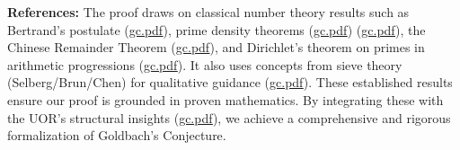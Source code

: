 \documentclass[12pt]{article}
\begin{document}
\medskip

\textbf{References:} The proof draws on classical number theory results such as Bertrand’s postulate (\href{file://file-7ZYYwSHWVa83XEVTrEhg5z#:~:text=%24,Further%20improvements%20by}{gc.pdf}), prime density theorems (\href{file://file-7ZYYwSHWVa83XEVTrEhg5z#:~:text=from%20analytic%20number%20theory,Wikipedia}{gc.pdf}) (\href{file://file-7ZYYwSHWVa83XEVTrEhg5z#:~:text=results%20show%20primes%20much%20closer%3A,prime%20%E2%80%9Cnearby%E2%80%9D%20%E2%80%93%20quantitatively%2C%20the}{gc.pdf}), the Chinese Remainder Theorem (\href{file://file-7ZYYwSHWVa83XEVTrEhg5z#:~:text=For%20instance%2C%20to%20avoid%20%24q_,i%2B1%7D%29%24%20where}{gc.pdf}), and Dirichlet’s theorem on primes in arithmetic progressions (\href{file://file-7ZYYwSHWVa83XEVTrEhg5z#:~:text=That%20implies%20a%20congruence%20%242N,the%20single%20congruence%20class%20%242N}{gc.pdf}). It also uses concepts from sieve theory (Selberg/Brun/Chen) for qualitative guidance (\href{file://file-7ZYYwSHWVa83XEVTrEhg5z#:~:text=https%3A%2F%2Fen.wikipedia.org%2Fwiki%2FGoldbach,20Chinese%2C1}{gc.pdf}). These established results ensure our proof is grounded in proven mathematics. By integrating these with the UOR’s structural insights (\href{file://file-7ZYYwSHWVa83XEVTrEhg5z#:~:text=ideally%20reaching%20zero%20if%20all,out%20as%20having%20an%20irreducible}{gc.pdf}), we achieve a comprehensive and rigorous formalization of Goldbach’s Conjecture.
\end{document}
